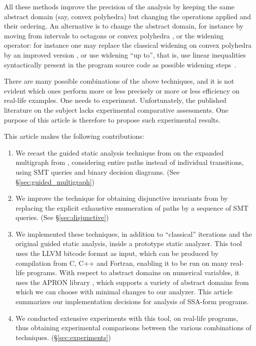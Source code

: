 \documentclass[preprint]{sigplanconf}
\begin{document}
All these methods improve the precision of the analysis by keeping the same abstract domain (say, convex polyhedra) but changing the operations applied and their ordering. An alternative is to change the abstract domain, for instance by moving from intervals to octagons or convex polyhedra \cite{DBLP:journals/lisp/Mine06,Mine_PhD}, or the widening operator: for instance one may replace the classical widening on convex polyhedra \cite{CousotHalbwachs78,Halbwachs_PhD} by an improved version \cite{BagnaraHRZ05SCP}, or use widening ``up to'', that is, use linear inequalities syntactically present in the program source code as possible widening steps~\cite{Polka:FMSD:97}.

There are many possible combinations of the above techniques, and it is not evident which ones perform more or less precisely or more or less efficiency on real-life examples. One needs to experiment. Unfortunately, the published literature on the subject lacks experimental comparative assessments. One purpose of this article is therefore to propose such experimental results.
\medskip

This article makes the following contributions:
\begin{enumerate}
\item We recast the guided static analysis technique from \citet{DBLP:conf/sas/GopanR07} on the expanded multigraph from \citet{Monniaux_Gonnord_SAS11}, considering entire paths instead of individual transitions, using SMT queries and binary decision diagrams.\label{contr:guided_multigraph} (See \S\ref{sec:guided_multigraph})
\item We improve the technique for obtaining disjunctive invariants from \citet{DBLP:conf/pldi/GulwaniZ10} by replacing the explicit exhaustive enumeration of paths by a sequence of SMT queries.\label{contr:disjunctive} (See \S\ref{sec:disjunctive})
\item We implemented these techniques, in addition to ``classical'' iterations and the original guided static analysis, inside a prototype static analyzer.
This tool uses the LLVM bitcode format \cite{Lattner:2004:LCF:977395.977673,LLVM_langref} as input, which can be produced by compilation from C, C++ and Fortran, enabling it to be run on many real-life programs.
With respect to abstract domains on numerical variables, it uses the APRON library \cite{DBLP:conf/cav/JeannetM09}, which supports a variety of abstract domains from which we can choose with minimal changes to our analyzer.
This article summarizes our implementation decisions for analysis of SSA-form programs.
\item We conducted extensive experiments with this tool, on real-life programs, thus obtaining experimental comparisons between the various combinations of techniques. (\S\ref{sec:experiments})
\end{enumerate}
\end{document}

